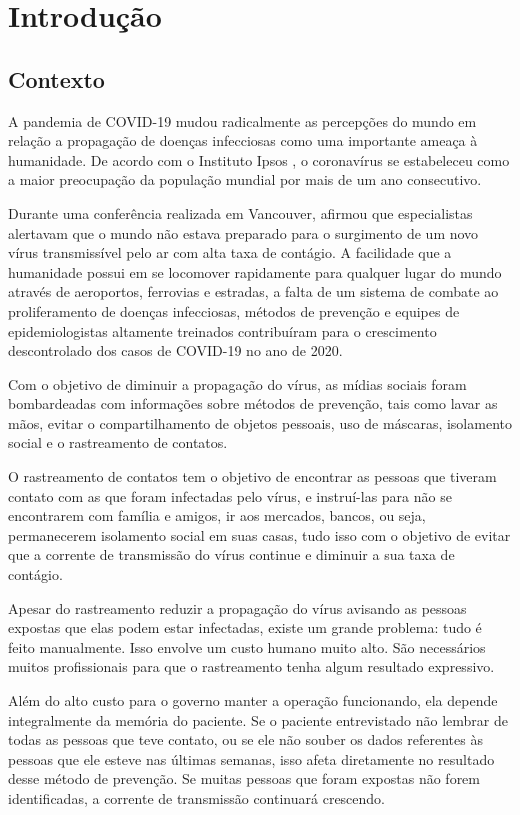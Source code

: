\chapter{Introdução}\label{chp:Introducao}

\section{Contexto}\label{sec:contexto}
A pandemia de COVID-19 mudou radicalmente as percepções do mundo em relação a propagação de doenças infecciosas como uma importante ameaça à humanidade. De acordo com o Instituto Ipsos \cite{Gebrekal2021}, o coronavírus se estabeleceu como a maior preocupação da população mundial por mais de um ano consecutivo.

Durante uma conferência realizada em Vancouver, \textcite{Gates2015} afirmou que especialistas alertavam que o mundo não estava preparado para o surgimento de um novo vírus transmissível pelo ar com alta taxa de contágio. A facilidade que a humanidade possui em se locomover rapidamente para qualquer lugar do mundo através de aeroportos, ferrovias e estradas, a falta de um sistema de combate ao proliferamento de doenças infecciosas, métodos de prevenção e equipes de epidemiologistas altamente treinados contribuíram para o crescimento descontrolado dos casos de COVID-19 no ano de 2020.

Com o objetivo de diminuir a propagação do vírus, as mídias sociais foram bombardeadas com informações sobre métodos de prevenção, tais como lavar as mãos, evitar o compartilhamento de objetos pessoais, uso de máscaras, isolamento social e o rastreamento de contatos.

O rastreamento de contatos tem o objetivo de encontrar as pessoas que tiveram contato com as que foram infectadas pelo vírus, e instruí-las para não se encontrarem com família e amigos, ir aos mercados, bancos, ou seja, permanecerem isolamento social em suas casas, tudo isso com o objetivo de evitar que a corrente de transmissão do vírus continue e diminuir a sua taxa de contágio.

Apesar do rastreamento reduzir a propagação do vírus avisando as pessoas expostas que elas podem estar infectadas, existe um grande problema: tudo é feito manualmente. Isso envolve um custo humano muito alto. São necessários muitos profissionais para que o rastreamento tenha algum resultado expressivo.

Além do alto custo para o governo manter a operação funcionando, ela depende integralmente da memória do paciente. Se o paciente entrevistado não lembrar de todas as pessoas que teve contato, ou se ele não souber os dados referentes às pessoas que ele esteve nas últimas semanas, isso afeta diretamente no resultado desse método de prevenção. Se muitas pessoas que foram expostas não forem identificadas, a corrente de transmissão continuará crescendo.

